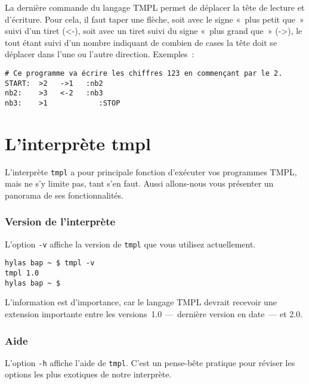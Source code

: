 \documentclass[a4paper, 11pt]{report}
\newcommand{\tmpl}{\texttt{tmpl}}
\begin{document}
La dernière commande du langage TMPL permet de déplacer la tête de
lecture et d'écriture. Pour cela, il faut taper une flèche, soit avec le
signe «~plus petit que~» suivi d'un tiret (<-), soit avec un tiret
suivi du signe «~plus grand que~» (->), le tout étant suivi d'un
nombre indiquant de combien de cases la tête doit se déplacer dans l'une
ou l'autre direction. Exemples~:



\begin{verbatim}
# Ce programme va écrire les chiffres 123 en commençant par le 2.
START:  >2   ->1   :nb2
nb2:    >3   <-2   :nb3
nb3:    >1            :STOP
\end{verbatim}



\part{L'interprète tmpl}

L'interprète \tmpl{} a pour principale fonction d'exécuter vos
programmes TMPL, mais ne s'y limite pas, tant s'en faut. Aussi
allons-nous vous présenter un panorama de ses fonctionnalités.

\par

\section{Version de l'interprète}

L'option \texttt{-v} affiche la version de \tmpl{} que vous
utilisez actuellement.

\begin{verbatim}
hylas bap ~ $ tmpl -v
tmpl 1.0
hylas bap ~ $
\end{verbatim}

\par

L'information est d'importance, car le langage TMPL devrait recevoir une
extension importante entre les versions~1.0 ---~dernière version en
date~--- et 2.0.



\section{Aide}

L'option \texttt{-h} affiche l'aide de \tmpl{}. C'est un pense-bête
pratique pour réviser les options les plus exotiques de notre
interprète.
\end{document}
